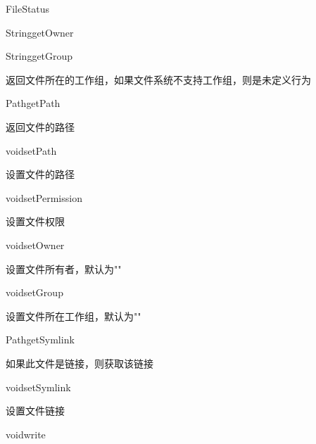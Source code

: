 \begin{XeClass}{FileStatus}
\begin{XeMethod}{\XePublic}{String}{getOwner}
    \end{XeMethod}

    \begin{XeMethod}{\XePublic}{String}{getGroup}
         
 返回文件所在的工作组，如果文件系统不支持工作组，则是未定义行为

    \end{XeMethod}

    \begin{XeMethod}{\XePublic}{Path}{getPath}
         
 返回文件的路径

    \end{XeMethod}

    \begin{XeMethod}{\XePublic}{void}{setPath}
         
 设置文件的路径

    \end{XeMethod}

    \begin{XeMethod}{\XeProtected}{void}{setPermission}
         
 设置文件权限

    \end{XeMethod}

    \begin{XeMethod}{\XeProtected}{void}{setOwner}
         
 设置文件所有者，默认为""

    \end{XeMethod}

    \begin{XeMethod}{\XeProtected}{void}{setGroup}
         
 设置文件所在工作组，默认为""

    \end{XeMethod}

    \begin{XeMethod}{\XePublic}{Path}{getSymlink}
         
 如果此文件是链接，则获取该链接

    \end{XeMethod}

    \begin{XeMethod}{\XePublic}{void}{setSymlink}
         
 设置文件链接

    \end{XeMethod}

    \begin{XeMethod}{\XePublic}{void}{write}
         

\end{XeMethod}
\end{XeClass}
